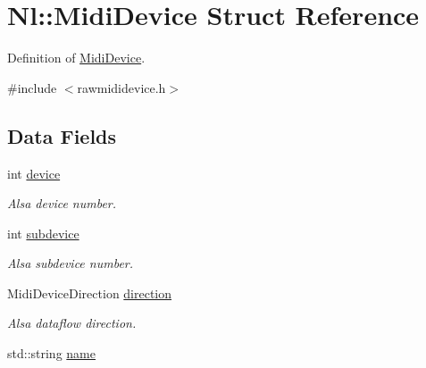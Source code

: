 \hypertarget{structNl_1_1MidiDevice}{\section{Nl\-:\-:Midi\-Device Struct Reference}
\label{structNl_1_1MidiDevice}
}


Definition of \hyperlink{structNl_1_1MidiDevice}{Midi\-Device}.  




{\ttfamily \#include $<$rawmididevice.\-h$>$}

\subsection*{Data Fields}
\begin{DoxyCompactItemize}
\item 
\hypertarget{structNl_1_1MidiDevice_a56780d796fc967d4e3b42b17c7febb13}{int \hyperlink{structNl_1_1MidiDevice_a56780d796fc967d4e3b42b17c7febb13}{device}}\label{structNl_1_1MidiDevice_a56780d796fc967d4e3b42b17c7febb13}

\begin{DoxyCompactList}\small\item\em Alsa device number. \end{DoxyCompactList}\item 
\hypertarget{structNl_1_1MidiDevice_aa6221088ffc10c61a143482da8489e12}{int \hyperlink{structNl_1_1MidiDevice_aa6221088ffc10c61a143482da8489e12}{subdevice}}\label{structNl_1_1MidiDevice_aa6221088ffc10c61a143482da8489e12}

\begin{DoxyCompactList}\small\item\em Alsa subdevice number. \end{DoxyCompactList}\item 
\hypertarget{structNl_1_1MidiDevice_ac9cd32f4346281d2d8fcf2abbbaae8b6}{Midi\-Device\-Direction \hyperlink{structNl_1_1MidiDevice_ac9cd32f4346281d2d8fcf2abbbaae8b6}{direction}}\label{structNl_1_1MidiDevice_ac9cd32f4346281d2d8fcf2abbbaae8b6}

\begin{DoxyCompactList}\small\item\em Alsa dataflow direction. \end{DoxyCompactList}\item 
\hypertarget{structNl_1_1MidiDevice_a7c697d4553518fdf5dbf9dfa9775af12}{std\-::string \hyperlink{structNl_1_1MidiDevice_a7c697d4553518fdf5dbf9dfa9775af12}{name}}\label{structNl_1_1MidiDevice_a7c697d4553518fdf5dbf9dfa9775af12}


\end{DoxyCompactItemize}

